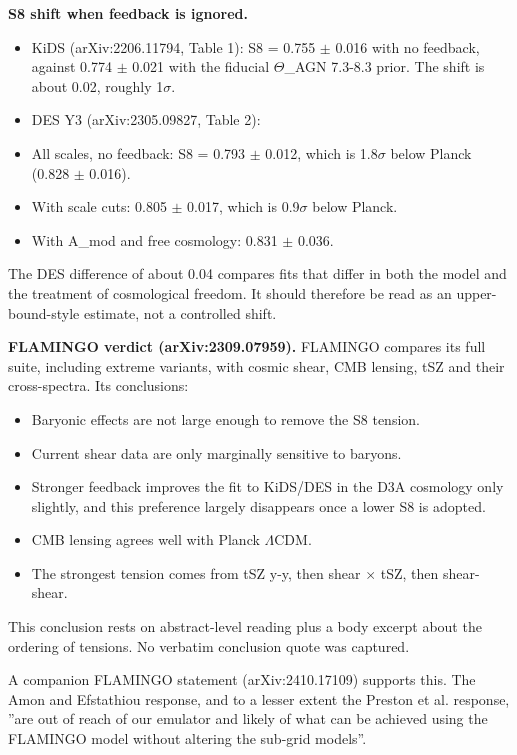 \documentclass[11pt,a4paper]{article}
\begin{document}
\textbf{S8 shift when feedback is ignored.}

\begin{itemize}
  \item KiDS (arXiv:2206.11794, Table 1): S8 = 0.755 $\pm$ 0.016 with no feedback, against 0.774 $\pm$ 0.021 with the fiducial $\Theta$\_AGN 7.3-8.3 prior. The shift is about 0.02, roughly 1$\sigma$.
  \item DES Y3 (arXiv:2305.09827, Table 2):
  \item All scales, no feedback: S8 = 0.793 $\pm$ 0.012, which is 1.8$\sigma$ below Planck (0.828 $\pm$ 0.016).
  \item With scale cuts: 0.805 $\pm$ 0.017, which is 0.9$\sigma$ below Planck.
  \item With A\_mod and free cosmology: 0.831 $\pm$ 0.036.
\end{itemize}
  The DES difference of about 0.04 compares fits that differ in both the model and the treatment of cosmological freedom. It should therefore be read as an upper-bound-style estimate, not a controlled shift.

\textbf{FLAMINGO verdict (arXiv:2309.07959).} FLAMINGO compares its full suite, including extreme variants, with cosmic shear, CMB lensing, tSZ and their cross-spectra. Its conclusions:

\begin{itemize}
  \item Baryonic effects are not large enough to remove the S8 tension.
  \item Current shear data are only marginally sensitive to baryons.
  \item Stronger feedback improves the fit to KiDS/DES in the D3A cosmology only slightly, and this preference largely disappears once a lower S8 is adopted.
  \item CMB lensing agrees well with Planck $\Lambda$CDM.
  \item The strongest tension comes from tSZ y-y, then shear $\times$ tSZ, then shear-shear.
\end{itemize}
This conclusion rests on abstract-level reading plus a body excerpt about the ordering of tensions. No verbatim conclusion quote was captured.

A companion FLAMINGO statement (arXiv:2410.17109) supports this. The Amon and Efstathiou response, and to a lesser extent the Preston et al. response, ''are out of reach of our emulator and likely of what can be achieved using the FLAMINGO model without altering the sub-grid models''.
\end{document}
